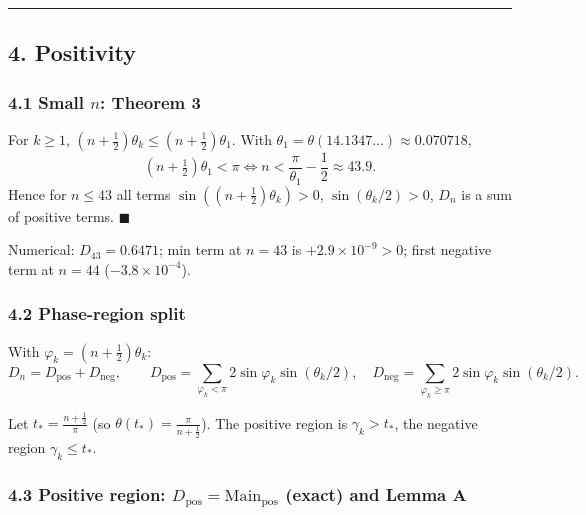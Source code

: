 \documentclass[
]{article}
\begin{document}
\begin{center}\rule{0.5\linewidth}{0.5pt}\end{center}

\hypertarget{positivity}{%
\subsection{4. Positivity}\label{positivity}}

\hypertarget{small-n-theorem-3}{%
\subsubsection{\texorpdfstring{4.1 Small \(n\): Theorem
3}{4.1 Small n: Theorem 3}}\label{small-n-theorem-3}}

For \(k\ge1\), \((n+\tfrac12)\theta_k \le (n+\tfrac12)\theta_1\). With
\(\theta_1 = \theta(14.1347\ldots) \approx 0.070718\),
\[(n+\tfrac12)\theta_1 < \pi \iff n < \frac{\pi}{\theta_1} - \frac12 \approx 43.9.\]
Hence for \(n \le 43\) all terms \(\sin((n+\tfrac12)\theta_k)>0\),
\(\sin(\theta_k/2)>0\), \(D_n\) is a sum of positive terms.
\(\blacksquare\)

Numerical: \(D_{43} = 0.6471\); min term at \(n=43\) is
\(+2.9\times10^{-9}>0\); first negative term at \(n=44\)
(\(-3.8\times10^{-4}\)).

\hypertarget{phase-region-split}{%
\subsubsection{4.2 Phase-region split}\label{phase-region-split}}

With \(\varphi_k = (n+\tfrac12)\theta_k\):
\[D_n = D_{\mathrm{pos}} + D_{\mathrm{neg}}, \qquad D_{\mathrm{pos}} = \sum_{\varphi_k<\pi} 2\sin\varphi_k\sin(\theta_k/2), \quad D_{\mathrm{neg}} = \sum_{\varphi_k\ge\pi} 2\sin\varphi_k\sin(\theta_k/2).\]

Let \(t_* = \tfrac{n+\frac12}{\pi}\) (so
\(\theta(t_*) = \tfrac{\pi}{n+\frac12}\)). The positive region is
\(\gamma_k > t_*\), the negative region \(\gamma_k \le t_*\).

\hypertarget{positive-region-d_mathrmpos-mathrmmain_mathrmpos-exact-and-lemma-a}{%
\subsubsection{\texorpdfstring{4.3 Positive region:
\(D_{\mathrm{pos}} = \mathrm{Main}_{\mathrm{pos}}\) (exact) and Lemma
A}{4.3 Positive region: D\_\{\textbackslash mathrm\{pos\}\} = \textbackslash mathrm\{Main\}\_\{\textbackslash mathrm\{pos\}\} (exact) and Lemma A}}\label{positive-region-d_mathrmpos-mathrmmain_mathrmpos-exact-and-lemma-a}}
\end{document}
